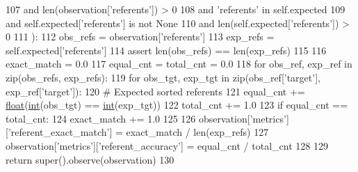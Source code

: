 \begin{DoxyCode}
107             \textcolor{keywordflow}{and} len(observation[\textcolor{stringliteral}{'referents'}]) > 0
108             \textcolor{keywordflow}{and} \textcolor{stringliteral}{'referents'} \textcolor{keywordflow}{in} self.expected
109             \textcolor{keywordflow}{and} self.expected[\textcolor{stringliteral}{'referents'}] \textcolor{keywordflow}{is} \textcolor{keywordflow}{not} \textcolor{keywordtype}{None}
110             \textcolor{keywordflow}{and} len(self.expected[\textcolor{stringliteral}{'referents'}]) > 0
111         ):
112             obs\_refs = observation[\textcolor{stringliteral}{'referents'}]
113             exp\_refs = self.expected[\textcolor{stringliteral}{'referents'}]
114             \textcolor{keyword}{assert} len(obs\_refs) == len(exp\_refs)
115 
116             exact\_match = 0.0
117             equal\_cnt = total\_cnt = 0.0
118             \textcolor{keywordflow}{for} obs\_ref, exp\_ref \textcolor{keywordflow}{in} zip(obs\_refs, exp\_refs):
119                 \textcolor{keywordflow}{for} obs\_tgt, exp\_tgt \textcolor{keywordflow}{in} zip(obs\_ref[\textcolor{stringliteral}{'target'}], exp\_ref[\textcolor{stringliteral}{'target'}]):
120                     \textcolor{comment}{# Expected sorted referents}
121                     equal\_cnt += \hyperlink{namespaceprojects_1_1controllable__dialogue_1_1make__control__dataset_aa2b7207688c641dbc094ab44eca27113}{float}(\hyperlink{namespacelanguage__model_1_1eval__ppl_a7d12ee00479673c5c8d1f6d01faa272a}{int}(obs\_tgt) == \hyperlink{namespacelanguage__model_1_1eval__ppl_a7d12ee00479673c5c8d1f6d01faa272a}{int}(exp\_tgt))
122                     total\_cnt += 1.0
123                 \textcolor{keywordflow}{if} equal\_cnt == total\_cnt:
124                     exact\_match += 1.0
125 
126             observation[\textcolor{stringliteral}{'metrics'}][\textcolor{stringliteral}{'referent\_exact\_match'}] = exact\_match / len(exp\_refs)
127             observation[\textcolor{stringliteral}{'metrics'}][\textcolor{stringliteral}{'referent\_accuracy'}] = equal\_cnt / total\_cnt
128 
129         \textcolor{keywordflow}{return} super().observe(observation)
130 
\end{DoxyCode}
\mbox{\label{classparlai_1_1tasks_1_1onecommon_1_1agents_1_1OneCommonTeacher_ac43c4e0932ed085c78357d74a767cf8f}} 
